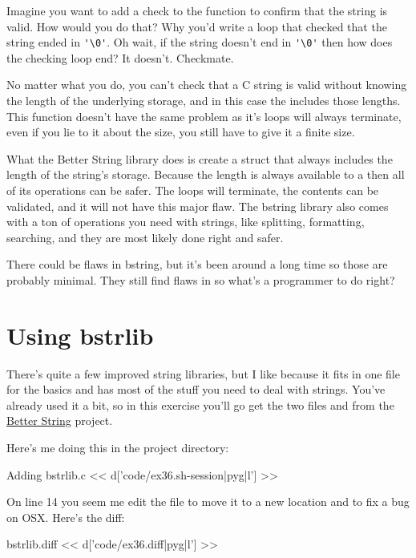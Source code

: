 Imagine you want to add a check to the  function to confirm that
the  string is valid.  How would you do that?  Why you'd write a
loop that checked that the string ended in \verb|'\0'|.  Oh wait, if the string
doesn't end in \verb|'\0'| then how does the checking loop end?  It doesn't.
Checkmate.

No matter what you do, you can't check that a C string is valid without
knowing the length of the underlying storage, and in this case the 
 includes those lengths.  This function doesn't have
the same problem as it's loops will always terminate, even if you lie
to it about the size, you still have to give it a finite size.

What the Better String library does is create a struct that always includes
the length of the string's storage.  Because the length is always available
to a  then all of its operations can be safer.  The loops
will terminate, the contents can be validated, and it will not have this
major flaw.  The bstring library also comes with a ton of operations
you need with strings, like splitting, formatting, searching, and 
they are most likely done right and safer.

There could be flaws in bstring, but it's been around a long time so
those are probably minimal.  They still find flaws in 
so what's a programmer to do right?

\section{Using bstrlib}

There's quite a few improved string libraries, but I like 
because it fits in one file for the basics and has most of the stuff you need
to deal with strings.  You've already used it a bit, so in this exercise you'll
go get the two files  and  from the
\href{http://bstring.sourceforge.net/}{Better String} project.

Here's me doing this in the  project directory:

\begin{code}{Adding bstrlib.c}
<< d['code/ex36.sh-session|pyg|l'] >>
\end{code}

On line 14 you seem me edit the  file to move it
to a new location and to fix a bug on OSX.  Here's the diff:

\begin{code}{bstrlib.diff}
<< d['code/ex36.diff|pyg|l'] >>
\end{code}


